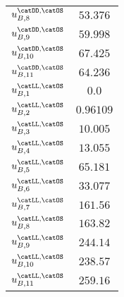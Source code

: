 \begin{table}[h]
\begin{tabular}[t]{lr@{$\,\pm\,$}l}
    $u_{B,8}^\text{\catDD,\catOS}$    & \multicolumn{2}{c}{$53.376$}\\
    $u_{B,9}^\text{\catDD,\catOS}$    & \multicolumn{2}{c}{$59.998$}\\
    $u_{B,10}^\text{\catDD,\catOS}$   & \multicolumn{2}{c}{$67.425$}\\
    $u_{B,11}^\text{\catDD,\catOS}$   & \multicolumn{2}{c}{$64.236$}\\
    $u_{B,1}^\text{\catLL,\catOS}$    & \multicolumn{2}{c}{$0.0$}\\    
    $u_{B,2}^\text{\catLL,\catOS}$    & \multicolumn{2}{c}{$0.96109$}\\    
    $u_{B,3}^\text{\catLL,\catOS}$    & \multicolumn{2}{c}{$10.005$}\\    
    $u_{B,4}^\text{\catLL,\catOS}$    & \multicolumn{2}{c}{$13.055$}\\    
    $u_{B,5}^\text{\catLL,\catOS}$    & \multicolumn{2}{c}{$65.181$}\\    
    $u_{B,6}^\text{\catLL,\catOS}$    & \multicolumn{2}{c}{$33.077$}\\    
    $u_{B,7}^\text{\catLL,\catOS}$    & \multicolumn{2}{c}{$161.56$}\\    
    $u_{B,8}^\text{\catLL,\catOS}$    & \multicolumn{2}{c}{$163.82$}\\    
    $u_{B,9}^\text{\catLL,\catOS}$    & \multicolumn{2}{c}{$244.14$}\\    
    $u_{B,10}^\text{\catLL,\catOS}$   & \multicolumn{2}{c}{$238.57$}\\    
    $u_{B,11}^\text{\catLL,\catOS}$   & \multicolumn{2}{c}{$259.16$}\\    
  \bottomrule
\end{tabular}
\end{table}
%
